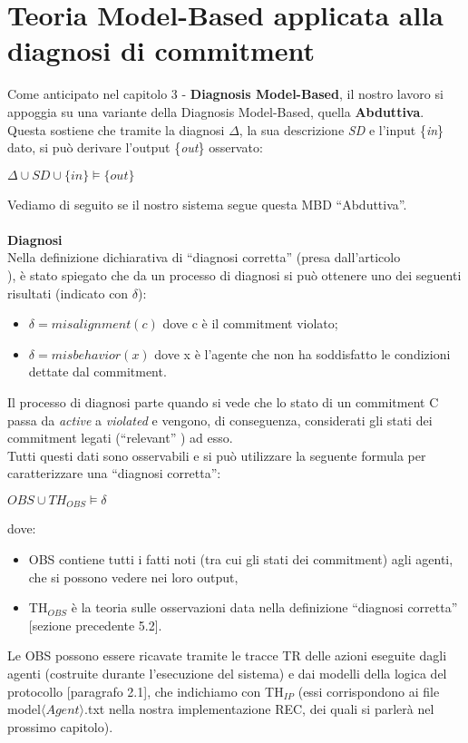 \documentclass[a4paper,12pt]{report}
\newcommand{\virgolette}[1]{``#1''}
\begin{document}
\section{Teoria Model-Based applicata alla diagnosi di commitment}
Come anticipato nel capitolo 3 - \textbf{Diagnosis Model-Based}, il nostro lavoro si appoggia su una variante della Diagnosis Model-Based, quella \textbf{Abduttiva}. Questa sostiene che tramite la diagnosi $\Delta$, la sua descrizione \textit{SD} e l'input \{\textit{in}\} dato, si può derivare l'output \{\textit{out}\} osservato:
\begin{center}
    $\Delta\cup SD\cup \{in\}\models \{out\}$
\end{center}
Vediamo di seguito se il nostro sistema segue questa MBD \virgolette{Abduttiva}.\\
\\\textbf{Diagnosi}\\
Nella definizione dichiarativa di \virgolette{diagnosi corretta} (presa dall'articolo\\\cite{rif5}), è stato spiegato che da un processo di diagnosi si può ottenere uno dei seguenti risultati (indicato con $\delta$):
\begin{itemize}
    \item $\delta = misalignment(c)$ dove c è il commitment violato;
    \item $\delta = misbehavior(x)$ dove x è l'agente che non ha soddisfatto le condizioni dettate dal commitment.
\end{itemize}
Il processo di diagnosi parte quando si vede che lo stato di un commitment C passa da \textit{active} a  \textit{violated} e vengono, di conseguenza, considerati gli stati dei commitment legati (\virgolette{relevant} \cite{rif5}) ad esso.\\
Tutti questi dati sono osservabili e si può utilizzare la seguente formula per caratterizzare una \virgolette{diagnosi corretta}:
\begin{center}
    $OBS\cup TH_{OBS}\models \delta$
\end{center}
dove:
\begin{itemize}
    \item OBS contiene tutti i fatti noti (tra cui gli stati dei commitment) agli agenti, che si possono vedere nei loro output,
    \item TH$_{OBS}$ è la teoria sulle osservazioni data nella definizione \virgolette{diagnosi corretta} [sezione precedente 5.2].
\end{itemize}
Le OBS possono essere ricavate tramite le tracce TR delle azioni eseguite dagli agenti (costruite durante l'esecuzione del sistema) e dai modelli della logica del protocollo [paragrafo 2.1], che indichiamo con TH$_{IP}$ (essi corrispondono ai file model$\langle Agent\rangle$.txt nella nostra implementazione REC, dei quali si parlerà nel prossimo capitolo).
\end{document}
